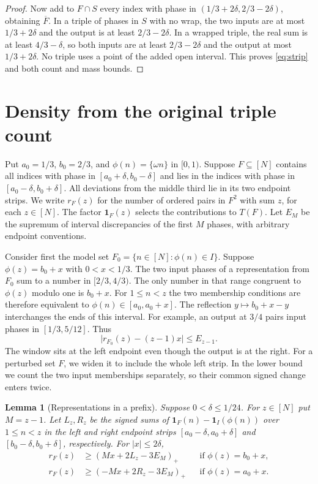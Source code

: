 \documentclass[11pt,reqno]{amsart}
\newtheorem{lemma}[theorem]{Lemma}
\newcommand{\ind}{\mathbf 1}
\numberwithin{equation}{section}
\begin{document}
\begin{proof}
Now add to \(F\cap S\) every index with phase in
\((1/3+2\delta,2/3-2\delta)\), obtaining \(\overline F\).
In a triple of phases in \(S\) with no wrap, the two inputs
are at most \(1/3+2\delta\) and the output is at least \(2/3-2\delta\).
In a wrapped triple, the real sum is at least \(4/3-\delta\),
so both inputs are at least \(2/3-2\delta\) and the output at most
\(1/3+2\delta\). No triple uses a point of the added open interval.
This proves \eqref{eq:strip} and both count and mass bounds.
\end{proof}

\section{Density from the original triple count}\label{sec:integer-density}

Put \(a_0=1/3\), \(b_0=2/3\), and \(\phi(n)=\{\omega n\}\) in
\([0,1)\). Suppose \(F\subseteq[N]\) contains all indices with
phase in \([a_0+\delta,b_0-\delta]\) and lies in the indices with
phase in \([a_0-\delta,b_0+\delta]\). All deviations from the
middle third lie in its two endpoint strips. We write \(r_F(z)\)
for the number of ordered pairs in \(F^2\) with sum \(z\), for each
\(z\in[N]\). The factor \(\ind_F(z)\) selects the contributions
to \(T(F)\). Let \(E_M\) be the supremum of interval discrepancies
of the first \(M\) phases, with arbitrary endpoint conventions.

Consider first the model set \(F_0=\{n\in[N]:\phi(n)\in I\}\).
Suppose \(\phi(z)=b_0+x\) with \(0<x<1/3\). The two input
phases of a representation from \(F_0\) sum to a number in
\([2/3,4/3)\). The only number in that range congruent to
\(\phi(z)\) modulo one is \(b_0+x\). For \(1\le n<z\)
the two membership conditions are therefore equivalent to
\(\phi(n)\in[a_0,a_0+x]\). The reflection
\(y\mapsto b_0+x-y\) interchanges the ends of this interval.
For example, an output at \(3/4\) pairs input phases in
\([1/3,5/12]\). Thus
\[
 \big|r_{F_0}(z)-(z-1)x\big|\le E_{z-1}.
\]
The window sits at the left endpoint even though the output
is at the right. For a perturbed set \(F\), we widen it to include
the whole left strip. In the lower bound we count the two input
memberships separately, so their common signed change enters twice.

\begin{lemma}[Representations in a prefix]\label{lem:prefix}
Suppose \(0<\delta\le1/24\). For \(z\in[N]\) put \(M=z-1\).
Let \(L_z,R_z\) be the signed sums of
\(\ind_F(n)-\ind_I(\phi(n))\) over \(1\le n<z\) in the left
and right endpoint strips \([a_0-\delta,a_0+\delta]\) and
\([b_0-\delta,b_0+\delta]\), respectively. For \(|x|\le2\delta\),
\begin{align}
 r_F(z)&\ge (Mx+2L_z-3E_M)_+ && \text{if }\phi(z)=b_0+x, \label{eq:repr-right}\\
 r_F(z)&\ge (-Mx+2R_z-3E_M)_+ && \text{if }\phi(z)=a_0+x. \label{eq:repr-left}
\end{align}
\end{lemma}
\end{document}
